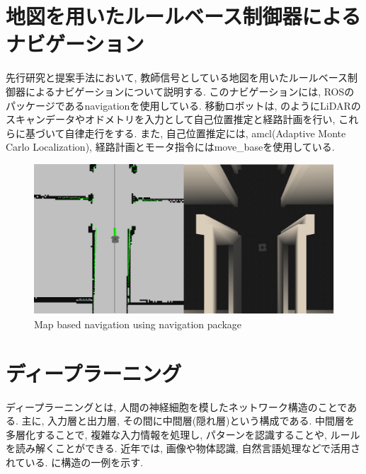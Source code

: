 
\section{地図を用いたルールベース制御器によるナビゲーション}
先行研究と提案手法において, 教師信号としている地図を用いたルールベース制御器によるナビゲーションについて説明する. このナビゲーションには, ROSのパッケージであるnavigation\cite{navigation}を使用している. 移動ロボットは, のようにLiDARのスキャンデータやオドメトリを入力として自己位置推定と経路計画を行い, これらに基づいて自律走行をする. また, 自己位置推定には, amcl(Adaptive Monte Carlo Localization), 経路計画とモータ指令にはmove\_base\cite{navigation}を使用している. 

\begin{figure}[h]
     \centering
     \includegraphics[keepaspectratio, scale=0.3]
     {images/navigation.png}
     \caption{Map based navigation using navigation package}
     \label{Fig:navigation}
     \end{figure}

\section{ディープラーニング}
ディープラーニングとは, 人間の神経細胞を模したネットワーク構造のことである. 主に, 入力層と出力層, その間に中間層(隠れ層)という構成である. 中間層を多層化することで, 複雑な入力情報を処理し, パターンを認識することや, ルールを読み解くことができる. 近年では, 画像や物体認識, 自然言語処理などで活用されている. に構造の一例を示す. 

\vspace{30mm}

